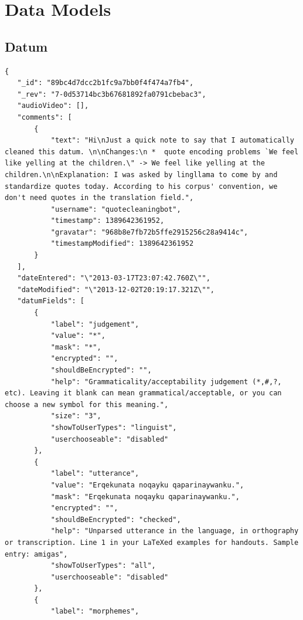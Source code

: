 \documentclass[12pt]{article}
\begin{document}
 
\section{Data Models}

\subsection{Datum}
\label{appendix:datumjson}

\begin{verbatim}
{
   "_id": "89bc4d7dcc2b1fc9a7bb0f4f474a7fb4",
   "_rev": "7-0d53714bc3b67681892fa0791cbebac3",
   "audioVideo": [],
   "comments": [
       {
           "text": "Hi\nJust a quick note to say that I automatically cleaned this datum. \n\nChanges:\n *  quote encoding problems `We feel like yelling at the children.\" -> We feel like yelling at the children.\n\nExplanation: I was asked by lingllama to come by and standardize quotes today. According to his corpus' convention, we don't need quotes in the translation field.",
           "username": "quotecleaningbot",
           "timestamp": 1389642361952,
           "gravatar": "968b8e7fb72b5ffe2915256c28a9414c",
           "timestampModified": 1389642361952
       }
   ],
   "dateEntered": "\"2013-03-17T23:07:42.760Z\"",
   "dateModified": "\"2013-12-02T20:19:17.321Z\"",
   "datumFields": [
       {
           "label": "judgement",
           "value": "*",
           "mask": "*",
           "encrypted": "",
           "shouldBeEncrypted": "",
           "help": "Grammaticality/acceptability judgement (*,#,?, etc). Leaving it blank can mean grammatical/acceptable, or you can choose a new symbol for this meaning.",
           "size": "3",
           "showToUserTypes": "linguist",
           "userchooseable": "disabled"
       },
       {
           "label": "utterance",
           "value": "Erqekunata noqayku qaparinaywanku.",
           "mask": "Erqekunata noqayku qaparinaywanku.",
           "encrypted": "",
           "shouldBeEncrypted": "checked",
           "help": "Unparsed utterance in the language, in orthography or transcription. Line 1 in your LaTeXed examples for handouts. Sample entry: amigas",
           "showToUserTypes": "all",
           "userchooseable": "disabled"
       },
       {
           "label": "morphemes",

\end{verbatim}
\end{document}
